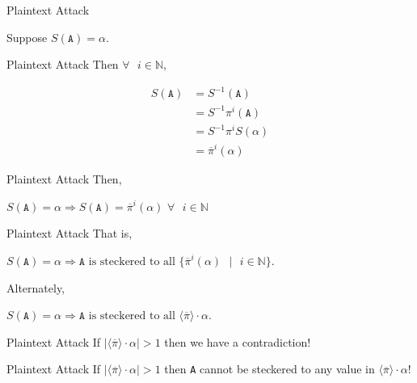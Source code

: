 \documentclass[hyphens,aspectratio=169]{beamer}
\begin{document}
\begin{frame}[fragile]{Plaintext Attack}
	\huge
	\begin{center}
		Suppose $S(\texttt{A})= \alpha$.
	\end{center}
\end{frame}

\begin{frame}[fragile]{Plaintext Attack}
	Then $\forall\text{ }i\in\mathbb{N}$,
	\begin{center}
        \begin{align*}
			S(\texttt{A}) & = S^{-1}(\texttt{A})
			\\&= S^{-1} \pi^i(\texttt{A})
            \\&= S^{-1} \pi^iS(\alpha)
            \\&= \overline\pi^{i}(\alpha)
		\end{align*}
	\end{center}
\end{frame}

\begin{frame}[fragile]{Plaintext Attack}
	Then,
	\begin{center}
		$S(\texttt{A}) = \alpha \Rightarrow S(\texttt{A}) =
			\overline{\pi}^i(\alpha)\text{
			}\forall\text{ }i\in\mathbb{N}$
	\end{center}
\end{frame}

\begin{frame}[fragile]{Plaintext Attack}
	That is,
	\begin{center}
		$S(\texttt{A}) = \alpha \Rightarrow \texttt{A} \text{ is steckered to all } \{\overline{\pi}^i(\alpha)\text{ }\vert\text{ }i\in\mathbb{N}\}$.
	\end{center}
	Alternately,
	\begin{center}
		$S(\texttt{A}) = \alpha \Rightarrow \texttt{A}\text{ is steckered to all }\langle\overline{\pi}\rangle\cdot{\alpha}$.
	\end{center}
\end{frame}

\begin{frame}[fragile]{Plaintext Attack}
	\large
	If $|\langle\overline{\pi}\rangle\cdot \alpha| > 1$ then we have a contradiction!
\end{frame}

\begin{frame}[fragile]{Plaintext Attack}
	\large
	If $|\langle\overline{\pi}\rangle\cdot \alpha| > 1$ then \texttt{A} cannot be steckered to any value in $\langle\overline{\pi}\rangle\cdot \alpha$!
\end{frame}
\end{document}
